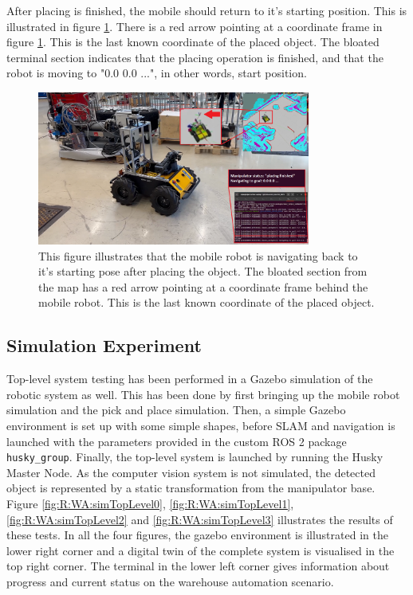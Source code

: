 After placing is finished, the mobile should return to it's starting position. This is illustrated in figure \ref{fig:R:WA:finalExperiment5}. There is a red arrow pointing at a coordinate frame in figure \ref{fig:R:WA:finalExperiment5}. This is the last known coordinate of the placed object. The bloated terminal section indicates that the placing operation is finished, and that the robot is moving to "0.0 0.0 ...", in other words, start position.

\begin{figure}[htp!]
  \centering
  \includegraphics[width = 0.8\textwidth]{Figures/figHuskyFinalExperiment5.png}
  \caption{This figure illustrates that the mobile robot is navigating back to it's starting pose after placing the object. The bloated section from the map has a red arrow pointing at a coordinate frame behind the mobile robot. This is the last known coordinate of the placed object.}
  \label{fig:R:WA:finalExperiment5}
\end{figure}

\FloatBarrier
\subsection{Simulation Experiment}
Top-level system testing has been performed in a Gazebo simulation of the robotic system as well. This has been done by first bringing up the mobile robot simulation and the pick and place simulation. Then, a simple Gazebo environment is set up with some simple shapes, before SLAM and navigation is launched with the parameters provided in the custom ROS 2 package \lstinline{husky_group}. Finally, the top-level system is launched by running the Husky Master Node. As the computer vision system is not simulated, the detected object is represented by a static transformation from the manipulator base. Figure \ref{fig:R:WA:simTopLevel0}, \ref{fig:R:WA:simTopLevel1}, \ref{fig:R:WA:simTopLevel2} and \ref{fig:R:WA:simTopLevel3} illustrates the results of these tests. In all the four figures, the gazebo environment is illustrated in the lower right corner and a digital twin of the complete system is visualised in the top right corner. The terminal in the lower left corner gives information about progress and current status on the warehouse automation scenario.

